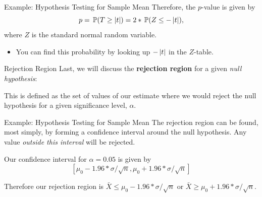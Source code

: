 \documentclass[aspectratio=169,t,11pt,table]{beamer}
\begin{document}
\begin{frame}{Example: Hypothesis Testing for Sample Mean}
  Therefore, the $p$-value is given by
  $$
    p = \prob{T \geq \abs{t}} = 2 * \prob{Z \leq -\abs{t}},
  $$
  where $Z$ is the standard normal random variable. 
  \pause
  \begin{itemize}
    \item You can find this probability by looking up $-\left\lvert t \right\rvert$ in the $Z$-table.
  \end{itemize}
\end{frame}

\begin{frame}{Rejection Region}
  Last, we will discuss the \textbf{rejection region} for a given \emph{null hypothesis}:

  \bigskip
  This is defined as the set of values of our estimate where we would reject the null hypothesis for a given significance level, $\alpha$.
\end{frame}

\begin{frame}{Example: Hypothesis Testing for Sample Mean}
  The rejection region can be found, most simply, by forming a confidence interval around the null hypothesis. Any value \emph{outside this interval} will be rejected.

  \pause
  \bigskip
  Our confidence interval for $\alpha = 0.05$ is given by 
  $$
    \left[ \mu_0 - 1.96 * \sigma/\sqrt{n},  \mu_0 + 1.96 * \sigma/\sqrt{n} \right]
  $$

  \bigskip
  Therefore our rejection region is $\bar{X} \leq \mu_0 - 1.96 * \sigma/\sqrt{n}$ or $\bar{X} \geq \mu_0 + 1.96 * \sigma/\sqrt{n}$.
\end{frame}
\end{document}
